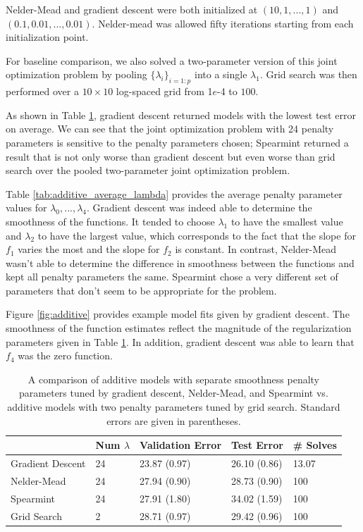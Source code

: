 \documentclass[12pt]{article}
\begin{document}
Nelder-Mead and gradient descent were both initialized at $(10, 1, ..., 1)$ and $(0.1, 0.01, ..., 0.01)$. Nelder-mead was allowed fifty iterations starting from each initialization point.

For baseline comparison, we also solved a two-parameter version of this joint optimization problem by pooling $\{\lambda_i\}_{i=1:p}$ into a single $\lambda_1$. Grid search was then performed over a $10 \times 10$ log-spaced grid from 1$e$-4 to $100$. 

As shown in Table \ref{tab:additive}, gradient descent returned models with the lowest test error on average. We can see that the joint optimization problem with 24 penalty parameters is sensitive to the penalty parameters chosen; Spearmint returned a result that is not only worse than gradient descent but even worse than grid search over the pooled two-parameter joint optimization problem.

Table \ref{tab:additive_average_lambda} provides the average penalty parameter values for $\lambda_0, ..., \lambda_4$. Gradient descent was indeed able to determine the smoothness of the functions. It tended to choose $\lambda_1$ to have the smallest value and $\lambda_2$ to have the largest value, which corresponds to the fact that the slope for $f_1$ varies the most and the slope for $f_2$ is constant. In contrast, Nelder-Mead wasn't able to determine the difference in smoothness between the functions and kept all penalty parameters the same. Spearmint chose a very different set of parameters that don't seem to be appropriate for the problem.

Figure \ref{fig:additive} provides example model fits given by gradient descent. The smoothness of the function estimates reflect the magnitude of the regularization parameters given in Table \ref{tab:additive}. In addition, gradient descent was able to learn that $f_4$ was the zero function.

\begin{table}
\caption {\label{tab:additive} A comparison of additive models with separate smoothness penalty parameters tuned by gradient descent, Nelder-Mead, and Spearmint vs. additive models with two penalty parameters tuned by grid search. Standard errors are given in parentheses.}
\centering
\begin{tabular}{| l | l | l | l | l | }
\hline
& Num $\lambda$ & Validation Error & Test Error & \# Solves\\
\hline
Gradient Descent & 24 & 23.87 (0.97) & 26.10 (0.86) & 13.07 \\
\hline
Nelder-Mead & 24 & 27.94 (0.90) & 28.73 (0.90) & 100 \\
\hline
Spearmint & 24 & 27.91 (1.80) & 34.02 (1.59) & 100 \\
\hline
Grid Search & 2 & 28.71 (0.97) & 29.42 (0.96) & 100 \\
\hline
\end{tabular}
\end{table}
\end{document}
